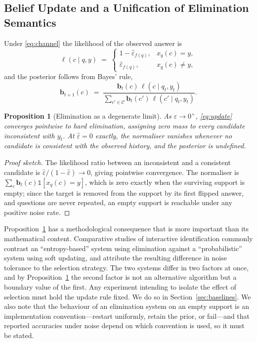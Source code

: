 \documentclass[conference]{IEEEtran}
\newcommand{\bb}{\mathbf{b}}
\newcommand{\Cat}{\mathcal{C}}
\newtheorem{proposition}{Proposition}
\begin{document}
\subsection{Belief Update and a Unification of Elimination Semantics}

Under \eqref{eq:channel} the likelihood of the observed answer is
\begin{equation}
\ell(c \mid q,y) \;=\;
\begin{cases}
1-\hat\varepsilon_{f(q)}, & x_q(c) = y,\\[2pt]
\hat\varepsilon_{f(q)}, & x_q(c) \neq y,
\end{cases}
\end{equation}
and the posterior follows from Bayes' rule,
\begin{equation}
\bb_{t+1}(c) \;=\;
\frac{\bb_t(c)\,\ell(c \mid q_t,y_t)}
     {\sum_{c'\in\Cat} \bb_t(c')\,\ell(c' \mid q_t,y_t)}.
\label{eq:update}
\end{equation}

\begin{proposition}[Elimination as a degenerate limit]
\label{prop:limit}
As $\hat\varepsilon \to 0^{+}$, \eqref{eq:update} converges pointwise to hard
elimination, assigning zero mass to every candidate inconsistent with $y_t$.
At $\hat\varepsilon = 0$ exactly, the normaliser vanishes whenever no candidate
is consistent with the observed history, and the posterior is undefined.
\end{proposition}

\begin{proof}[Proof sketch]
The likelihood ratio between an inconsistent and a consistent candidate is
$\hat\varepsilon/(1-\hat\varepsilon) \to 0$, giving pointwise convergence. The
normaliser is $\sum_c \bb_t(c)\mathbb{1}[x_q(c)=y]$, which is zero exactly when
the surviving support is empty; since the target is removed from the support by
its first flipped answer, and questions are never repeated, an empty support is
reachable under any positive noise rate.
\end{proof}

Proposition~\ref{prop:limit} has a methodological consequence that is more
important than its mathematical content. Comparative studies of interactive
identification commonly contrast an ``entropy-based'' system using elimination
against a ``probabilistic'' system using soft updating, and attribute the
resulting difference in noise tolerance to the selection strategy. The two
systems differ in two factors at once, and by
Proposition~\ref{prop:limit} the second factor is not an alternative algorithm
but a boundary value of the first. Any experiment intending to isolate the
effect of selection must hold the update rule fixed. We do so in
Section~\ref{sec:baselines}. We also note that the behaviour of an elimination
system on an empty support is an implementation convention---restart uniformly,
retain the prior, or fail---and that reported accuracies under noise depend on
which convention is used, so it must be stated.
\end{document}
